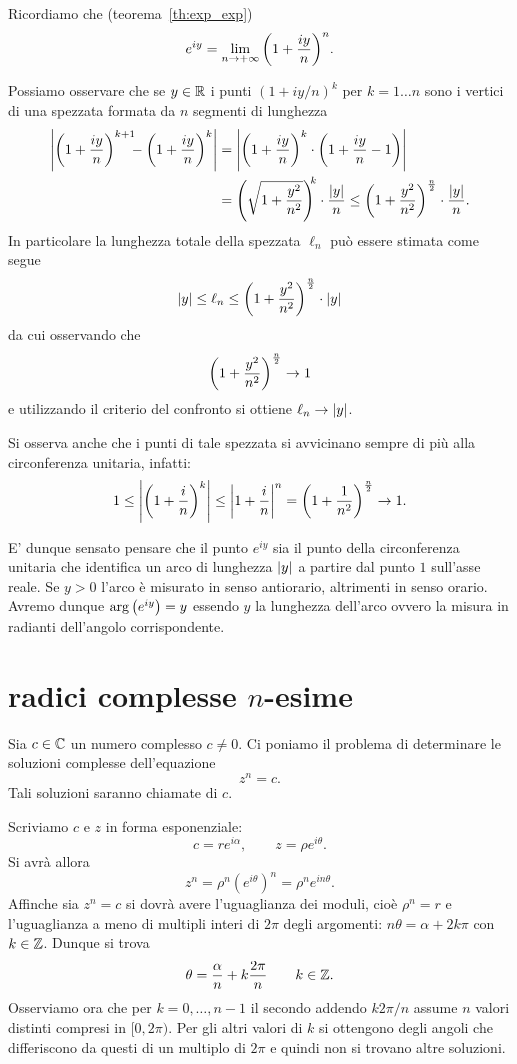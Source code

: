 \begin{remark}
Ricordiamo che (teorema~\ref{th:exp_exp})
\[
  e^{iy} = \lim_{n\to +\infty} {\left( 1+\frac{iy}{n} \right)}^n.
\]

Possiamo osservare che se $y\in \mathbb R$
i punti $(1+iy/n)^k$ per $k=1\dots n$
sono i vertici di una spezzata
formata da $n$ segmenti
di lunghezza
\begin{align*}
 {\left|{\left( 1+\frac{iy}n \right)}^{k+1}\!\!\! - {\left( 1+ \frac{iy}n \right)}^k\right|}
 &= {\left|{\left( 1+\frac{iy}n \right)}^k\cdot {\left( 1+\frac{iy}n -1 \right)}\right|}\\
 &= {\left( \sqrt{1+\frac{y^2}{n^2}} \right)}^{\!\!k} \cdot \frac{{\left|y\right|}}{n}
 \le {\left( 1+\frac{y^2}{n^2} \right)}^{\frac n 2}\cdot \frac{{\left|y\right|}}{n}.
\end{align*}
In particolare la lunghezza totale della spezzata $\ell_n$ può essere stimata
come segue
\[
  {\left|y\right|}
  \le \ell_n
  \le {\left( 1+\frac{y^2}{n^2} \right)}^{\frac n 2} \cdot {\left|y\right|}
\]
da cui osservando che
\[
 {\left( 1+\frac{y^2}{n^2} \right)}^{\frac n 2} \to 1
\]
e utilizzando il criterio del confronto
si ottiene $\ell_n \to {\left|y\right|}$.

Si osserva anche che i punti di tale spezzata si avvicinano
sempre di più alla circonferenza unitaria, infatti:
\[
  1
  \le {\left|{\left( 1 + \frac i n \right)}^k\right|}
  \le {\left|1+\frac i n\right|}^n
  = {\left( 1 + \frac 1 {n^2} \right)}^{\frac n 2}
  \to 1.
\]

E' dunque sensato pensare che il punto $e^{iy}$ sia il punto
della circonferenza unitaria che identifica un arco di lunghezza ${\left|y\right|}$
a partire dal punto $1$ sull'asse reale.
Se $y>0$ l'arco è misurato in senso antiorario, altrimenti in senso orario.
Avremo dunque $\arg{\left( e^{iy} \right)} = y$ essendo $y$ la lunghezza dell'arco
ovvero la misura in radianti dell'angolo corrispondente.
\end{remark}

\section{radici complesse $n$-esime}

Sia $c\in \mathbb C$ un numero
complesso $c\neq 0$.
Ci poniamo il problema di determinare le soluzioni complesse
dell'equazione
\[
  z^n = c.
\]
Tali soluzioni saranno chiamate  di $c$.

Scriviamo $c$ e $z$ in forma esponenziale:
\[
  c = r e^{i\alpha}, \qquad
  z = \rho e^{i\theta}.
\]
Si avrà allora
\[
  z^n = \rho^n (e^{i\theta})^n = \rho^n e^{i n \theta}.
\]
Affinche sia $z^n = c$ si dovrà avere l'uguaglianza dei moduli, cioè $\rho^n = r$ e l'uguaglianza a meno di multipli interi di $2\pi$ degli argomenti:
$n \theta = \alpha + 2 k \pi$ con $k\in \mathbb Z$.
Dunque si trova
\[
  \theta = \frac{\alpha}{n} + k\frac{2\pi}{n}
\qquad k \in \mathbb Z.
\]
Osserviamo ora che per $k=0,\dots, n-1$ il secondo addendo
$k 2\pi /n$ assume $n$ valori distinti compresi in $[0,2\pi)$.
Per gli altri valori di $k$ si ottengono degli angoli che differiscono
da questi di un multiplo di $2\pi$ e quindi non si trovano
altre soluzioni.

